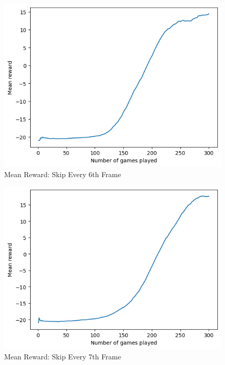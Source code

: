 \documentclass[12pt, a4paper, twocolumn]{article} %
\begin{document}
\begin{figure}[H]
	\includegraphics[width=\linewidth]{mr_sk6.PNG} %
	\caption{Mean Reward: Skip Every 6th Frame} %
\end{figure}

\begin{figure}[H]
	\includegraphics[width=\linewidth]{mr_sk7.PNG} %
	\caption{Mean Reward: Skip Every 7th Frame} %
\end{figure}
\end{document}
